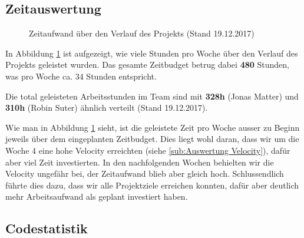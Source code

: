 \subsection{Zeitauswertung}
\label{sub:Zeitauswertung}

\begin{figure}[H]
    \centering

    \caption[Diagramm Zeitaufwand über den Verlauf des Projekts]{Zeitaufwand über den Verlauf des Projekts (Stand 19.12.2017)}
    \label{chart:Zeitauswertung}
\end{figure}

In Abbildung \ref{chart:Zeitauswertung} ist aufgezeigt, wie viele Stunden pro Woche über den Verlauf des Projekts geleistet wurden. Das gesamte Zeitbudget betrug dabei \textbf{480} Stunden, was pro Woche ca. 34 Stunden entspricht.

Die total geleisteten Arbeitsstunden im Team sind mit \textbf{328h} (Jonas Matter) und \textbf{310h} (Robin Suter) ähnlich verteilt (Stand 19.12.2017).

Wie man in Abbildung \ref{chart:Zeitauswertung} sieht, ist die geleistete Zeit pro Woche ausser zu Beginn jeweils über dem eingeplanten Zeitbudget. Dies liegt wohl daran, dass wir um die Woche 4 eine hohe Velocity erreichten (siehe \ref{sub:Auswertung Velocity}), dafür aber viel Zeit investierten. In den nachfolgenden Wochen behielten wir die Velocity ungefähr bei, der Zeitaufwand blieb aber gleich hoch. Schlussendlich führte dies dazu, dass wir alle Projektziele erreichen konnten, dafür aber deutlich mehr Arbeitsaufwand als geplant investiert haben.

\subsection{Codestatistik}
\label{sub:Codestatistik}

